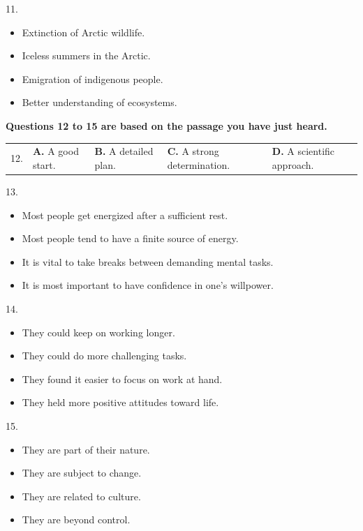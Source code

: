\documentclass[UTF8,11pt]{ctexart}
\begin{document}
11.


\begin{itemize}[leftmargin=2em,itemsep=.2em,topsep=.4em]\item[A.] Extinction of Arctic wildlife.
\item[B.] Iceless summers in the Arctic.
\item[C.] Emigration of indigenous people.
\item[D.] Better understanding of ecosystems.
\end{itemize}

\textbf{Questions 12 to 15 are based on the passage you have just heard.}


\noindent\begin{tabularx}{\linewidth}{@{}lXXXX@{}}12. & \textbf{A.} A good start. & \textbf{B.} A detailed plan. & \textbf{C.} A strong determination. & \textbf{D.} A scientific approach.\\\end{tabularx}\par

13.


\begin{itemize}[leftmargin=2em,itemsep=.2em,topsep=.4em]\item[A.] Most people get energized after a sufficient rest.
\item[B.] Most people tend to have a finite source of energy.
\item[C.] It is vital to take breaks between demanding mental tasks.
\item[D.] It is most important to have confidence in one’s willpower.
\end{itemize}

14.


\begin{itemize}[leftmargin=2em,itemsep=.2em,topsep=.4em]\item[A.] They could keep on working longer.
\item[B.] They could do more challenging tasks.
\item[C.] They found it easier to focus on work at hand.
\item[D.] They held more positive attitudes toward life.
\end{itemize}

15.


\begin{itemize}[leftmargin=2em,itemsep=.2em,topsep=.4em]\item[A.] They are part of their nature.
\item[B.] They are subject to change.
\item[C.] They are related to culture.
\item[D.] They are beyond control.
\end{itemize}
\end{document}
